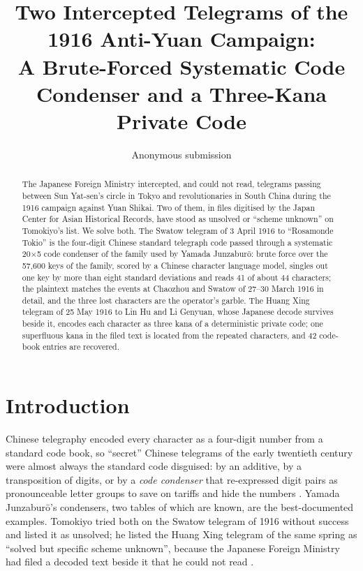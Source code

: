 \documentclass[11pt]{article}
\title{Two Intercepted Telegrams of the 1916 Anti-Yuan Campaign: \\ A Brute-Forced Systematic Code Condenser and a Three-Kana Private Code}
\author{Anonymous submission}
\date{}
\begin{document}
\maketitle

\begin{abstract}
The Japanese Foreign Ministry intercepted, and could not read, telegrams passing between Sun Yat-sen's circle in Tokyo and revolutionaries in South China during the 1916 campaign against Yuan Shikai. Two of them, in files digitised by the Japan Center for Asian Historical Records, have stood as unsolved or ``scheme unknown'' on Tomokiyo's list. We solve both. The Swatow telegram of 3 April 1916 to ``Rosamonde Tokio'' is the four-digit Chinese standard telegraph code passed through a systematic 20$\times$5 code condenser of the family used by Yamada Junzabur\={o}: brute force over the 57,600 keys of the family, scored by a Chinese character language model, singles out one key by more than eight standard deviations and reads 41 of about 44 characters; the plaintext matches the events at Chaozhou and Swatow of 27--30 March 1916 in detail, and the three lost characters are the operator's garble. The Huang Xing telegram of 25 May 1916 to Lin Hu and Li Genyuan, whose Japanese decode survives beside it, encodes each character as three kana of a deterministic private code; one superfluous kana in the filed text is located from the repeated characters, and 42 code-book entries are recovered.
\end{abstract}

\section{Introduction}

Chinese telegraphy encoded every character as a four-digit number from a standard code book, so ``secret'' Chinese telegrams of the early twentieth century were almost always the standard code disguised: by an additive, by a transposition of digits, or by a \emph{code condenser} that re-expressed digit pairs as pronounceable letter groups to save on tariffs and hide the numbers \cite{Tomokiyo:chinese}. Yamada Junzabur\={o}'s condensers, two tables of which are known, are the best-documented examples. Tomokiyo tried both on the Swatow telegram of 1916 without success and listed it as unsolved; he listed the Huang Xing telegram of the same spring as ``solved but specific scheme unknown'', because the Japanese Foreign Ministry had filed a decoded text beside it that he could not read \cite{Tomokiyo:unsolved}.
\end{document}
